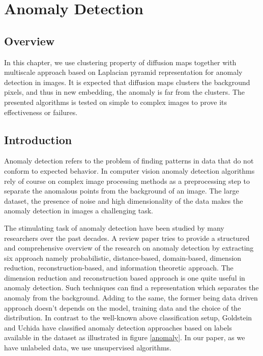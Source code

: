 \chapter{Anomaly Detection} %

\label{Chapter5} %


\section*{Overview}
In this chapter, we use clustering property of diffusion maps together with multiscale approach based on Laplacian pyramid representation for anomaly detection in images. It is expected that diffusion maps clusters the background pixels, and thus in new embedding, the anomaly is far from the clusters. The presented algorithms is tested  on simple to complex images to prove its effectiveness or failures.

\section{Introduction}
\label{C5:Intro}
Anomaly detection refers to the problem of finding patterns in data that do not conform to expected behavior. In computer vision anomaly detection algorithms rely of course on complex image processing methods as a preprocessing step to separate the anomalous points from the background of
an image. The large dataset, the presence of noise and high dimensionality of the data makes the anomaly detection in images a challenging task.

The stimulating task of anomaly detection have been studied by many researchers over the past decades. A review paper \citep{Pime2014}  tries to provide a structured and comprehensive overview of the research on anomaly detection by extracting six approach namely probabilistic, distance-based, domain-based, dimension reduction, reconstruction-based,  and information theoretic approach. The dimension reduction and reconstruction based approach   is one quite useful in anomaly detection. Such techniques can find a representation which separates the anomaly from the background. Adding to the same, the former being data driven approach doesn't depends on the model, training data and the choice of the distribution. In contrast to the well-known above classification setup, Goldstein and Uchida \citep{Gold2016} have classified anomaly detection approaches based on labels available in the dataset as illustrated in figure \ref{anomaly}. In our paper, as we have unlabeled data, we use unsupervised algorithms.

